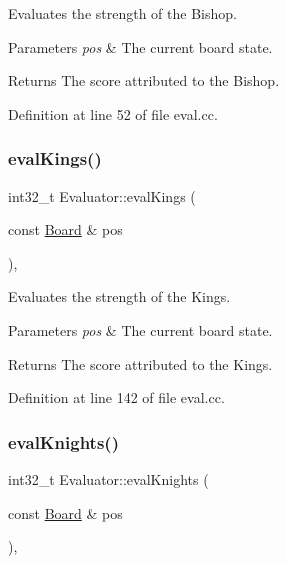 Evaluates the strength of the Bishop. 


\begin{DoxyParams}{Parameters}
{\em pos} & The current board state. \\
\hline
\end{DoxyParams}
\begin{DoxyReturn}{Returns}
The score attributed to the Bishop. 
\end{DoxyReturn}


Definition at line 52 of file eval.\+cc.

\mbox{\label{classEvaluator_af8971fc82010e0a08a1e510847bf304c}} 
\subsubsection{\texorpdfstring{eval\+Kings()}{evalKings()}}
{\footnotesize\ttfamily int32\+\_\+t Evaluator\+::eval\+Kings (\begin{DoxyParamCaption}\item[{const \mbox{\hyperlink{classBoard}{Board}} \&}]{pos }\end{DoxyParamCaption})\hspace{0.3cm}{\ttfamily [private]}, {\ttfamily [noexcept]}}



Evaluates the strength of the Kings. 


\begin{DoxyParams}{Parameters}
{\em pos} & The current board state. \\
\hline
\end{DoxyParams}
\begin{DoxyReturn}{Returns}
The score attributed to the Kings. 
\end{DoxyReturn}


Definition at line 142 of file eval.\+cc.

\mbox{\label{classEvaluator_aaf81df6872cb3c5acabc05b4865c4bcd}} 
\subsubsection{\texorpdfstring{eval\+Knights()}{evalKnights()}}
{\footnotesize\ttfamily int32\+\_\+t Evaluator\+::eval\+Knights (\begin{DoxyParamCaption}\item[{const \mbox{\hyperlink{classBoard}{Board}} \&}]{pos }\end{DoxyParamCaption})\hspace{0.3cm}{\ttfamily [private]}, {\ttfamily [noexcept]}}



